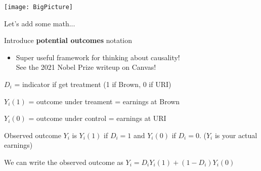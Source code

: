 \documentclass[11pt,english,handout]{beamer}
\newenvironment{wideitemize}{\itemize\addtolength{\itemsep}{10pt}}{\enditemize}
\begin{document}
\begin{frame}
	\texttt{[image: BigPicture]}
\end{frame}


\begin{frame}{Let's add some math...}
\begin{wideitemize}
	\item Introduce \textbf{potential outcomes} notation
		\begin{itemize}
			\item 
			Super useful framework for thinking about causality! \\
			See the 2021 Nobel Prize writeup on Canvas!
		\end{itemize}
	
	\pause 
	\item $D_i$ = indicator if get treatment (1 if Brown, 0 if URI)
	
	\pause
	\item $Y_i(1)$ = outcome under treament = earnings at Brown
	\item $Y_i(0)$ = outcome under control = earnings at URI
	
	\pause 
	\item Observed outcome $Y_i$ is $Y_i(1)$ if $D_i = 1$ and $Y_i(0)$ if $D_i = 0$. ($Y_i$ is your actual earnings)
	
	\pause
	\item
	We can write the observed outcome as $Y_i = D_i Y_i(1) + (1-D_i) Y_i(0)$
\end{wideitemize}

\end{frame}
\end{document}
